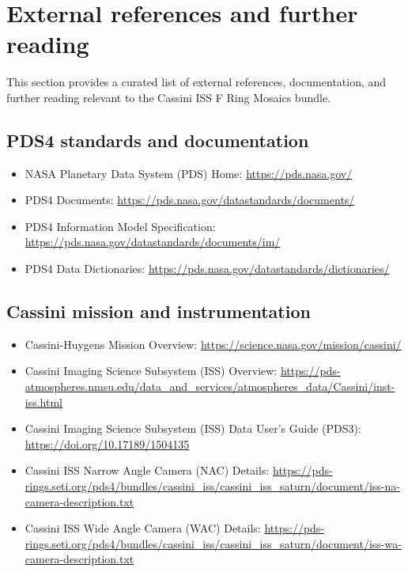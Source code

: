 
\section{External references and further reading}
\label{sec:external-references-and-further-reading}

This section provides a curated list of external references, documentation, and further reading relevant to the Cassini ISS F Ring Mosaics bundle.


\subsection{PDS4 standards and documentation}
\label{sec:pds4-standards-and-documentation}

\begin{itemize}
\item NASA Planetary Data System (PDS) Home: \url{https://pds.nasa.gov/}
\item PDS4 Documents: \url{https://pds.nasa.gov/datastandards/documents/}
\item PDS4 Information Model Specification: \url{https://pds.nasa.gov/datastandards/documents/im/}
\item PDS4 Data Dictionaries: \url{https://pds.nasa.gov/datastandards/dictionaries/}
\end{itemize}

\subsection{Cassini mission and instrumentation}
\label{sec:cassini-mission-and-instrumentation}

\begin{itemize}
\item Cassini-Huygens Mission Overview: \url{https://science.nasa.gov/mission/cassini/}
\item Cassini Imaging Science Subsystem (ISS) Overview: \url{https://pds-atmospheres.nmsu.edu/data_and_services/atmospheres_data/Cassini/inst-iss.html}
\item Cassini Imaging Science Subsystem (ISS) Data User’s Guide (PDS3): \url{https://doi.org/10.17189/1504135}
\item Cassini ISS Narrow Angle Camera (NAC) Details: \url{https://pds-rings.seti.org/pds4/bundles/cassini_iss/cassini_iss_saturn/document/iss-na-camera-description.txt}
\item Cassini ISS Wide Angle Camera (WAC) Details: \url{https://pds-rings.seti.org/pds4/bundles/cassini_iss/cassini_iss_saturn/document/iss-wa-camera-description.txt}
\end{itemize}

